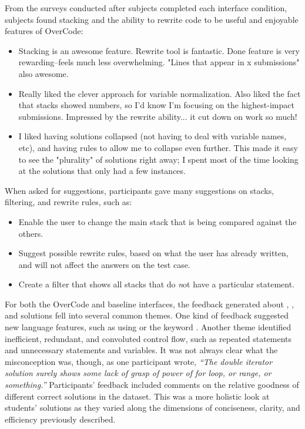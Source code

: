 From the surveys conducted after subjects completed each interface condition, subjects found stacking and the ability to rewrite code to be useful and enjoyable features of OverCode:
\begin{itemize}
\item Stacking is an awesome feature. Rewrite tool is fantastic. Done feature is very rewarding--feels much less overwhelming. "Lines that appear in x submissions" also awesome.

\item Really liked the clever approach for variable normalization. Also liked the fact that stacks showed numbers, so I'd know I'm focusing on the highest-impact submissions. Impressed by the rewrite ability... it cut down on work so much!

\item I liked having solutions collapsed (not having to deal with variable names, etc), and having rules to allow me to collapse even further. This made it easy to see the "plurality" of solutions right away; I spent most of the time looking at the solutions that only had a few instances.
\end{itemize}

When asked for suggestions, participants gave many suggestions on stacks, filtering, and rewrite rules, such as:
\begin{itemize}

\item Enable the user to change the main stack that is being compared against the others.
\item Suggest possible rewrite rules, based on what the user has already written, and will not affect the answers on the test case.
\item Create a filter that shows all stacks that do {\emph not} have a particular statement.
\end{itemize}

For both the OverCode and baseline interfaces, the feedback generated about , , and  solutions fell into several common themes. One kind of feedback suggested new language features, such as using \codevar{*=} or the keyword . Another theme identified inefficient, redundant, and convoluted control flow, such as repeated statements and unnecessary statements and variables. It was not always clear what the misconception was, though, as one participant wrote, \textit{``The double iterator solution surely shows some lack of grasp of power of for loop, or range, or something.''} Participants' feedback included comments on the relative goodness of different correct solutions in the dataset. This was a more holistic look at students' solutions as they varied along the dimensions of conciseness, clarity, and efficiency previously described.

